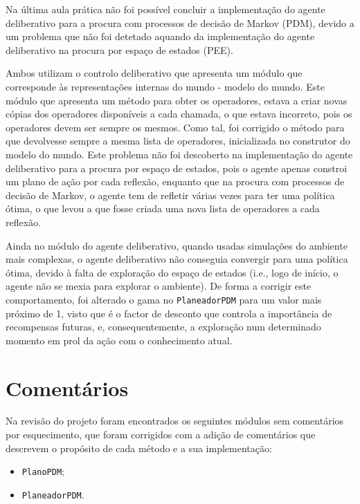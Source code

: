Na última aula prática não foi possível concluir a implementação do agente deliberativo para a procura com processos de decisão de Markov (PDM), devido a um problema que não foi detetado aquando da implementação do agente deliberativo na procura por espaço de estados (PEE).

Ambos utilizam o controlo deliberativo que apresenta um módulo que corresponde às representações internas do mundo - modelo do mundo.
Este módulo que apresenta um método para obter os operadores, estava a criar novas cópias dos operadores disponíveis a cada chamada, o que estava incorreto, pois os operadores devem ser sempre os mesmos.
Como tal, foi corrigido o método para que devolvesse sempre a mesma lista de operadores, inicializada no construtor do modelo do mundo.
Este problema não foi descoberto na implementação do agente deliberativo para a procura por espaço de estados, pois o agente apenas constroi um plano de ação por cada reflexão, enquanto que na procura com processos de decisão de Markov, o agente tem de refletir várias vezes para ter uma política ótima, o que levou a que fosse criada uma nova lista de operadores a cada reflexão.

Ainda no módulo do agente deliberativo, quando usadas simulações do ambiente mais complexas, o agente deliberativo não conseguia convergir para uma política ótima, devido à falta de exploração do espaço de estados (i.e., logo de início, o agente não se mexia para explorar o ambiente).
De forma a corrigir este comportamento, foi alterado o gama no \texttt{PlaneadorPDM} para um valor mais próximo de 1, visto que é o factor de desconto que controla a importância de recompensas futuras, e, consequentemente, a exploração num determinado momento em prol da ação com o conhecimento atual.


\section{Comentários}\label{sec:comentarios}

Na revisão do projeto foram encontrados os seguintes módulos sem comentários por esquecimento, que foram corrigidos com a adição de comentários que descrevem o propósito de cada método e a sua implementação:

\begin{itemize}
    \item \texttt{PlanoPDM};
    \item \texttt{PlaneadorPDM}.
\end{itemize}
